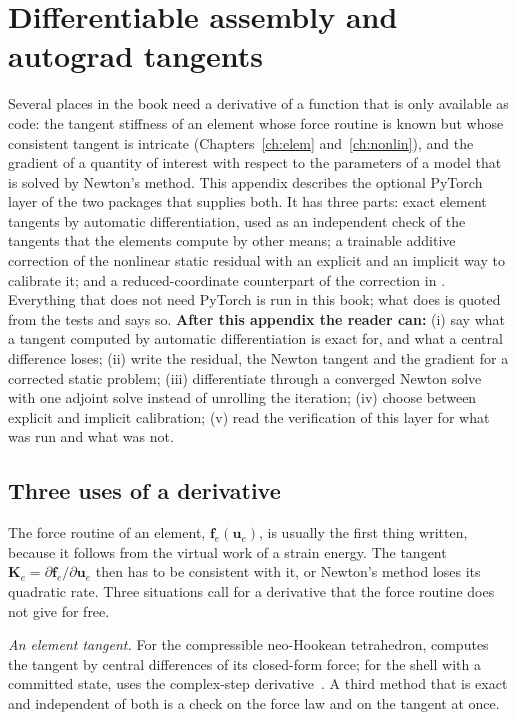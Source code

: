 \chapter{Differentiable assembly and autograd tangents}\label{ch:diff}

\begin{tcolorbox}[colback=gray!5,colframe=gray!50,title={In this appendix}]
Several places in the book need a derivative of a function that is only available as code: the tangent stiffness of an element whose force routine is known but whose consistent tangent is intricate (Chapters~\ref{ch:elem} and~\ref{ch:nonlin}), and the gradient of a quantity of interest with respect to the parameters of a model that is solved by Newton's method. This appendix describes the optional PyTorch layer of the two packages that supplies both. It has three parts: exact element tangents by automatic differentiation, used as an independent check of the tangents that the elements compute by other means; a trainable additive correction of the nonlinear static residual with an explicit and an implicit way to calibrate it; and a reduced-coordinate counterpart of the correction in \rom{}. Everything that does not need PyTorch is run in this book; what does is quoted from the tests and says so.
\textbf{After this appendix the reader can:} (i) say what a tangent computed by automatic differentiation is exact for, and what a central difference loses; (ii) write the residual, the Newton tangent and the gradient for a corrected static problem; (iii) differentiate through a converged Newton solve with one adjoint solve instead of unrolling the iteration; (iv) choose between explicit and implicit calibration; (v) read the verification of this layer for what was run and what was not.
\end{tcolorbox}

\section{Three uses of a derivative}\label{sec:df-uses}

The force routine of an element, $\bm f_e(\bm u_e)$, is usually the first thing written, because it follows from the virtual work of a strain energy. The tangent $\bm K_e=\partial\bm f_e/\partial\bm u_e$ then has to be consistent with it, or Newton's method loses its quadratic rate. Three situations call for a derivative that the force routine does not give for free.

\emph{An element tangent.} For the compressible neo-Hookean tetrahedron,  computes the tangent by central differences of its closed-form force; for the shell with a committed state,  uses the complex-step derivative~\cite{squire1998complex}. A third method that is exact and independent of both is a check on the force law and on the tangent at once.

